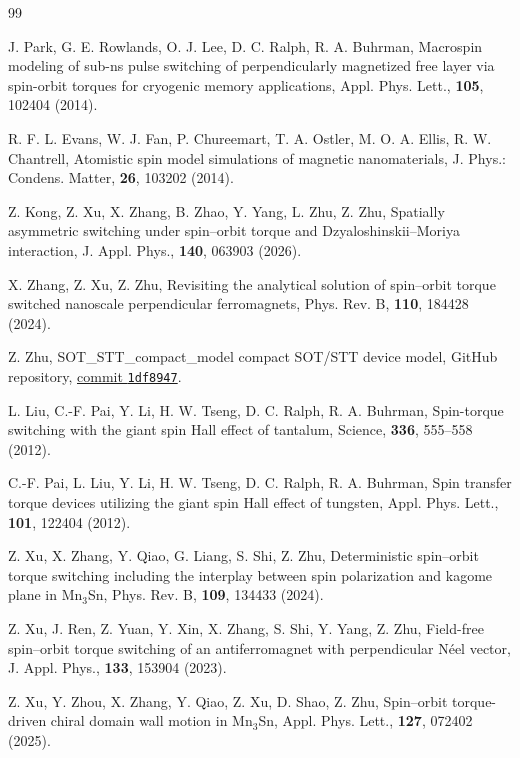 \begin{thebibliography}{99}

J. Park, G. E. Rowlands, O. J. Lee, D. C. Ralph, R. A. Buhrman,
Macrospin modeling of sub-ns pulse switching of perpendicularly magnetized free
layer via spin-orbit torques for cryogenic memory applications,
Appl. Phys. Lett., \textbf{105}, 102404 (2014).

R. F. L. Evans, W. J. Fan, P. Chureemart, T. A. Ostler, M. O. A. Ellis,
R. W. Chantrell,
Atomistic spin model simulations of magnetic nanomaterials,
J. Phys.: Condens. Matter, \textbf{26}, 103202 (2014).

Z. Kong, Z. Xu, X. Zhang, B. Zhao, Y. Yang, L. Zhu, Z. Zhu,
Spatially asymmetric switching under spin--orbit torque and
Dzyaloshinskii--Moriya interaction,
J. Appl. Phys., \textbf{140}, 063903 (2026).

X. Zhang, Z. Xu, Z. Zhu,
Revisiting the analytical solution of spin--orbit torque switched nanoscale
perpendicular ferromagnets,
Phys. Rev. B, \textbf{110}, 184428 (2024).

Z. Zhu,
SOT\_STT\_compact\_model compact SOT/STT device model,
GitHub repository,
\href{https://github.com/zhuzibn/SOT_STT_compact_model/tree/1df8947c2ea5ab6249b8f0a953cdc81c36f238aa}%
{commit \texttt{1df8947}}.

L. Liu, C.-F. Pai, Y. Li, H. W. Tseng, D. C. Ralph, R. A. Buhrman,
Spin-torque switching with the giant spin Hall effect of tantalum,
Science, \textbf{336}, 555--558 (2012).

C.-F. Pai, L. Liu, Y. Li, H. W. Tseng, D. C. Ralph, R. A. Buhrman,
Spin transfer torque devices utilizing the giant spin Hall effect of tungsten,
Appl. Phys. Lett., \textbf{101}, 122404 (2012).

Z. Xu, X. Zhang, Y. Qiao, G. Liang, S. Shi, Z. Zhu,
Deterministic spin--orbit torque switching including the interplay between spin
polarization and kagome plane in Mn$_3$Sn,
Phys. Rev. B, \textbf{109}, 134433 (2024).

Z. Xu, J. Ren, Z. Yuan, Y. Xin, X. Zhang, S. Shi, Y. Yang, Z. Zhu,
Field-free spin--orbit torque switching of an antiferromagnet with perpendicular
N\'eel vector,
J. Appl. Phys., \textbf{133}, 153904 (2023).

Z. Xu, Y. Zhou, X. Zhang, Y. Qiao, Z. Xu, D. Shao, Z. Zhu,
Spin--orbit torque-driven chiral domain wall motion in Mn$_3$Sn,
Appl. Phys. Lett., \textbf{127}, 072402 (2025).


\end{thebibliography}
